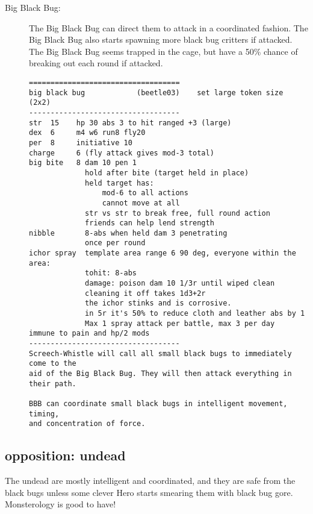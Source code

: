 \begin{description}
\item[Big Black Bug:] The Big Black Bug can direct them to attack in a coordinated fashion. The Big Black Bug also starts spawning more black bug critters if attacked. The Big Black Bug seems trapped in the cage, but have a 50\% chance of breaking out each round if attacked.
\goodbreak \begin{samepage} \small \begin{verbatim}
===================================
big black bug            (beetle03)    set large token size (2x2)
-----------------------------------
str  15    hp 30 abs 3 to hit ranged +3 (large)
dex  6     m4 w6 run8 fly20
per  8     initiative 10
charge     6 (fly attack gives mod-3 total)
big bite   8 dam 10 pen 1
             hold after bite (target held in place)
             held target has:
                 mod-6 to all actions
                 cannot move at all
             str vs str to break free, full round action
             friends can help lend strength
nibble       8-abs when held dam 3 penetrating
             once per round
ichor spray  template area range 6 90 deg, everyone within the area:
             tohit: 8-abs
             damage: poison dam 10 1/3r until wiped clean
             cleaning it off takes 1d3+2r
             the ichor stinks and is corrosive.
             in 5r it's 50% to reduce cloth and leather abs by 1
             Max 1 spray attack per battle, max 3 per day
immune to pain and hp/2 mods
-----------------------------------
Screech-Whistle will call all small black bugs to immediately come to the
aid of the Big Black Bug. They will then attack everything in their path.

BBB can coordinate small black bugs in intelligent movement, timing,
and concentration of force.
\end{verbatim} \normalsize \end{samepage}

\end{description}


\subsection*{opposition: undead}

The undead are mostly intelligent and coordinated, and they are safe from the black bugs unless some clever Hero starts smearing them with black bug gore. Monsterology is good to have!

